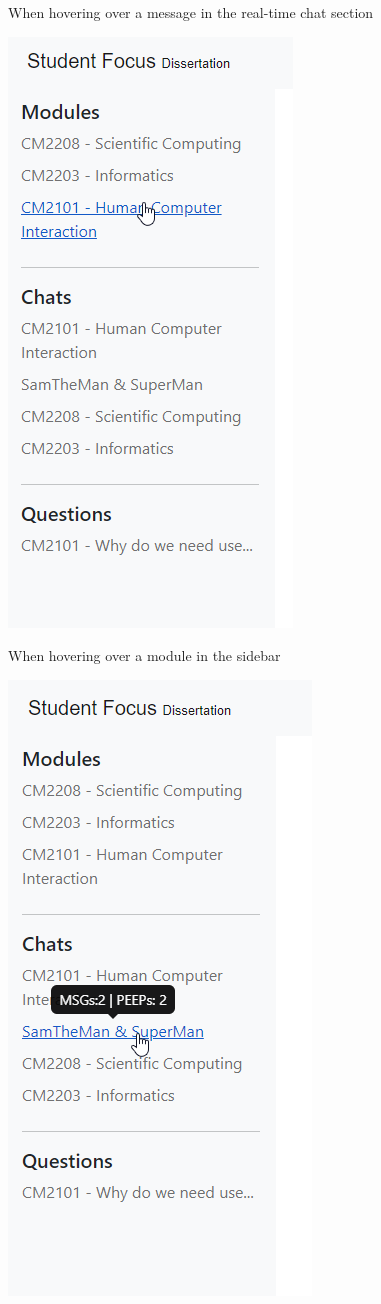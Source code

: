 When hovering over a message in the real-time chat section

\includegraphics[scale=0.50]{images/application/60 - aside_module_hover.png}

When hovering over a module in the sidebar

\includegraphics[scale=0.50]{images/application/61 - aside_chat_hover.png}

